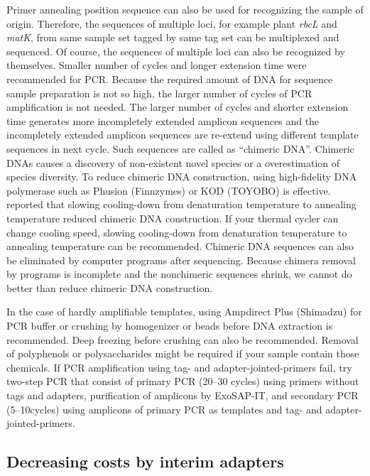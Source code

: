 \documentclass[titlepage,10pt,a4paper,english]{jsbook}
\begin{document}
Primer annealing position sequence can also be used for recognizing the sample of origin.
Therefore, the sequences of multiple loci, for example plant \textit{rbcL} and \textit{matK}, from same sample set tagged by same tag set can be multiplexed and sequenced.
Of course, the sequences of multiple loci can also be recognized by themselves.
Smaller number of cycles and longer extension time were recommended for PCR.
Because the required amount of DNA for sequence sample preparation is not so high, the larger number of cycles of PCR amplification is not needed.
The larger number of cycles and shorter extension time generates more incompletely extended amplicon sequences and the incompletely extended amplicon sequences are re-extend using different template sequences in next cycle.
Such sequences are called as ``chimeric DNA''.
Chimeric DNAs causes a discovery of non-existent novel species or a overestimation of species diversity.
To reduce chimeric DNA construction, using high-fidelity DNA polymerase such as Phusion (Finnzymes) or KOD (TOYOBO) is effective.
\citet{Stevens2013} reported that slowing cooling-down from denaturation temperature to annealing temperature reduced chimeric DNA construction.
If your thermal cycler can change cooling speed, slowing cooling-down from denaturation temperature to annealing temperature can be recommended.
Chimeric DNA sequences can also be eliminated by computer programs after sequencing.
Because chimera removal by programs is incomplete and the nonchimeric sequences shrink, we cannot do better than reduce chimeric DNA construction.

In the case of hardly amplifiable templates, using Ampdirect Plus (Shimadzu) for PCR buffer or crushing by homogenizer or beads before DNA extraction is recommended.
Deep freezing before crushing can also be recommended.
Removal of polyphenols or polysaccharides might be required if your sample contain those chemicals.
If PCR amplification using tag- and adapter-jointed-primers fail, try two-step PCR that consist of primary PCR (20--30 cycles) using primers without tags and adapters, purification of amplicons by ExoSAP-IT, and secondary PCR (5--10cycles) using amplicons of primary PCR as templates and tag- and adapter-jointed-primers.

\subsection{Decreasing costs by interim adapters}\label{subsection:interimadapter}
\end{document}
